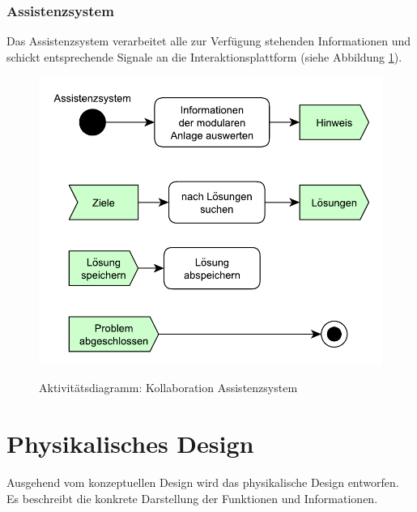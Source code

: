 \subsubsection*{Assistenzsystem}
Das Assistenzsystem verarbeitet alle zur Verfügung stehenden Informationen und schickt entsprechende Signale an die Interaktionsplattform (siehe Abbildung \ref{pic:Kollaboration-Assistenzsystem}).
\begin{figure}[htbp]
\centering
\includegraphics[scale=0.5]{DA_files/UML/Konzept/Aktivitaetsdiagramm-Assistenz.pdf}
\label{pic:Kollaboration-Assistenzsystem}
\caption{Aktivitätsdiagramm: Kollaboration Assistenzsystem}
\end{figure}

\section{Physikalisches Design}
\label{4:Physikalische-Design}
Ausgehend vom konzeptuellen Design wird das physikalische Design entworfen. Es beschreibt die konkrete Darstellung der Funktionen und Informationen. 

